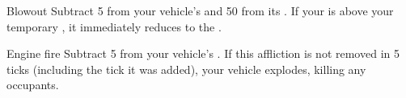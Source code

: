 

\begin{describe}{Blowout}
  Subtract 5 from your vehicle's  and 50 from its . If your  is above your temporary , it immediately reduces to the .
\end{describe}

\begin{describe}{Engine fire}
  Subtract 5 from your vehicle's . If this affliction is not removed in 5 ticks (including the tick it was added), your vehicle explodes, killing any occupants.
\end{describe}
